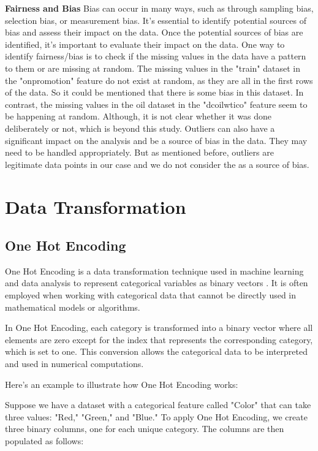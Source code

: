 	\textbf{Fairness and Bias}
	Bias can occur in many ways, such as through sampling bias, selection bias, or measurement bias. It's essential to identify potential sources of bias and assess their impact on the data. Once the potential sources of bias are identified, it's important to evaluate their impact on the data. 
	One way to identify fairness/bias is to check if the missing values in the data have a pattern to them or  are missing at random. The missing values in the "train" dataset in the "onpromotion" feature do not exist at random, as they are all in the first rows of the data. So it could be mentioned that there is some bias in this dataset. In contrast, the missing values in the oil dataset in the "dcoilwtico" feature seem to be happening at random. Although, it is not clear whether it was done deliberately or not, which is beyond this study.
	Outliers can also have a significant impact on the analysis and be a source of bias in the data. They may need to be handled appropriately. But as mentioned before, outliers are legitimate data points in our case and we do not consider the as a source of bias. 


\section{Data Transformation}

\subsection{One Hot Encoding}

One Hot Encoding is a data transformation technique used in machine learning and data analysis to represent categorical variables as binary vectors \cite{Harris:2015}. It is often employed when working with categorical data that cannot be directly used in mathematical models or algorithms.

In One Hot Encoding, each category is transformed into a binary vector where all elements are zero except for the index that represents the corresponding category, which is set to one. This conversion allows the categorical data to be interpreted and used in numerical computations.

Here's an example to illustrate how One Hot Encoding works:

Suppose we have a dataset with a categorical feature called "Color" that can take three values: "Red," "Green," and "Blue." To apply One Hot Encoding, we create three binary columns, one for each unique category. The columns are then populated as follows:

